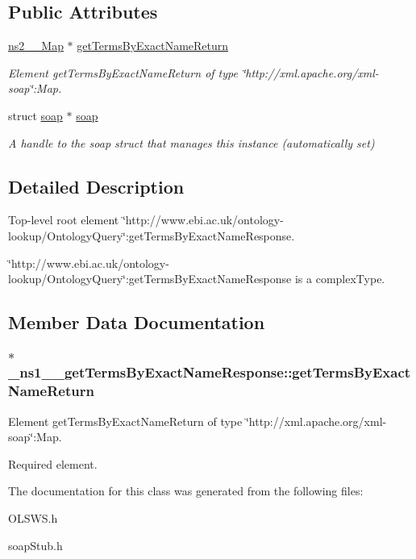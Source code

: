 \subsection*{Public Attributes}
\begin{DoxyCompactItemize}
\item 
\hyperlink{classns2____Map}{ns2\_\-\_\-Map} $\ast$ \hyperlink{class__ns1____getTermsByExactNameResponse_ae772bbe6954275e8cf086c656dd7448b}{getTermsByExactNameReturn}
\begin{DoxyCompactList}\small\item\em Element getTermsByExactNameReturn of type \char`\"{}http://xml.apache.org/xml-\/soap\char`\"{}:Map. \end{DoxyCompactList}\item 
\hypertarget{class__ns1____getTermsByExactNameResponse_a2bfa7b974df7f2a1c9d5b2a53870812f}{
struct \hyperlink{class__ns1____getTermsByExactNameResponse_a2bfa7b974df7f2a1c9d5b2a53870812f}{soap} $\ast$ \hyperlink{class__ns1____getTermsByExactNameResponse_a2bfa7b974df7f2a1c9d5b2a53870812f}{soap}}
\label{class__ns1____getTermsByExactNameResponse_a2bfa7b974df7f2a1c9d5b2a53870812f}

\begin{DoxyCompactList}\small\item\em A handle to the soap struct that manages this instance (automatically set) \end{DoxyCompactList}\end{DoxyCompactItemize}


\subsection{Detailed Description}
Top-\/level root element \char`\"{}http://www.ebi.ac.uk/ontology-\/lookup/OntologyQuery\char`\"{}:getTermsByExactNameResponse. 

\char`\"{}http://www.ebi.ac.uk/ontology-\/lookup/OntologyQuery\char`\"{}:getTermsByExactNameResponse is a complexType. 

\subsection{Member Data Documentation}
\hypertarget{class__ns1____getTermsByExactNameResponse_ae772bbe6954275e8cf086c656dd7448b}{
\subsubsection[{getTermsByExactNameReturn}]{ $\ast$ {\bf \_\-ns1\_\-\_\-getTermsByExactNameResponse::getTermsByExactNameReturn}}}
\label{class__ns1____getTermsByExactNameResponse_ae772bbe6954275e8cf086c656dd7448b}


Element getTermsByExactNameReturn of type \char`\"{}http://xml.apache.org/xml-\/soap\char`\"{}:Map. 

Required element. 

The documentation for this class was generated from the following files:\begin{DoxyCompactItemize}
\item 
OLSWS.h\item 
soapStub.h\end{DoxyCompactItemize}
